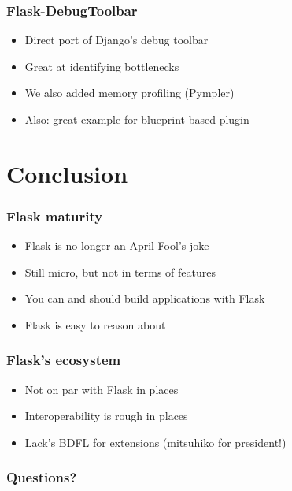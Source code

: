 \documentclass[14pt]{beamer}
\begin{document}
\begin{frame}
  \frametitle{Flask-DebugToolbar}
  \begin{itemize}
  \item Direct port of Django's debug toolbar
  \item Great at identifying bottlenecks
  \item We also added memory profiling (Pympler)
  \item Also: great example for blueprint-based plugin
  \end{itemize}
\end{frame}

\section{Conclusion}

\begin{frame}
  \frametitle{Flask maturity}
  \begin{itemize}
  \item Flask is no longer an April Fool's joke
  \item Still micro, but not in terms of features
  \item You can and should build applications with Flask
  \item Flask is easy to reason about
  \end{itemize}
\end{frame}

\begin{frame}
  \frametitle{Flask's ecosystem}
  \begin{itemize}
  \item Not on par with Flask in places
  \item Interoperability is rough in places
  \item Lack's BDFL for extensions (mitsuhiko for president!)
  \end{itemize}
\end{frame}

\begin{frame}
  \frametitle{Questions?}
\end{frame}
\end{document}
